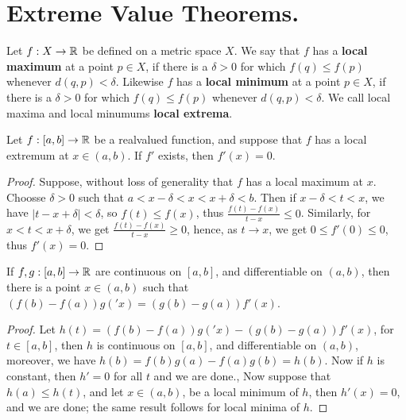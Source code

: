 
\section{Extreme Value Theorems.}

\begin{definition}
    Let $f:X \rightarrow \mathbb{R}$ be defined on a metric space $X$. We say that  $f$ has a 
    \textbf{local maximum} at a point  $p \in X$, if  there is a $\delta>0$ for which  $f(q) \leq f(p)$ 
    whenever  $d(q,p)<\delta$. Likewise $f$ has a \textbf{local minimum} at a point  $p \in X$, 
    if  there is a $\delta>0$ for which  $f(q) \leq f(p)$ whenever  $d(q,p)<\delta$. We call 
    local maxima and local minumums \textbf{local extrema}.
\end{definition}

\begin{theorem}\label{6.2.1}
    Let $f:[a,b] \rightarrow \mathbb{R}$ be a realvalued function, and suppose that  $f$ has a local 
    extremum at  $x \in (a,b)$. If $f'$ exists, then  $f'(x)=0$.
\end{theorem}
\begin{proof}
    Suppose, without loss of generality that $f$ has a local maximum at  $x$. Choosse  $\delta>0$ 
    such that $a<x-\delta<x<x+\delta<b$. Then if  $x-\delta<t<x$, we have  $|t-x+\delta|<\delta$, so  $f(t) \leq f(x)$, 
    thus  $\frac{f(t)-f(x)}{t-x} \leq 0$. Similarly, for $x<t<x+\delta$, we get $\frac{f(t)-f(x)}{t-x} \geq 0$, 
    hence, as $t \rightarrow x$, we get  $0 \leq f'(0) \leq 0$, thus  $f'(x)=0$.
\end{proof}

\begin{theorem}\label{6.2.2}
    If $f,g:[a,b] \rightarrow \mathbb{R}$ are continuous on  $[a,b]$, and differentiable on  $(a,b)$, then 
    there is a point  $x \in (a,b)$ such that $(f(b)-f(a))g('x)=(g(b)-g(a))f'(x)$.
\end{theorem}
\begin{proof}
    Let $h(t)=(f(b)-f(a))g('x)-(g(b)-g(a))f'(x)$, for $t \in [a,b]$, then $h$ is continuous on 
    $[a,b]$, and differentiable on  $(a,b)$, moreover, we have  $h(b)=f(b)g(a)-f(a)g(b)=h(b)$. Now 
    if  $h$ is constant, then $h'=0$ for all  $t$ and we are done., Now suppose that  $h(a) \leq h(t)$, 
    and let  $x \in (a,b)$, be a local minimum of $h$, then  $h'(x)=0$, and we are done; the same 
    result follows for local minima of  $h$.
\end{proof}

